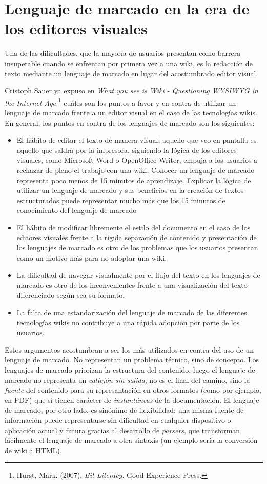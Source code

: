 \documentclass[12pt, a4paper,twoside]{book}
\begin{document}
\section{Lenguaje de marcado en la era de los editores visuales}

Una de las dificultades, que la mayoría de usuarios presentan como
barrera insuperable cuando se enfrentan por primera vez a una wiki,
es la redacción de texto mediante un lenguaje de marcado en lugar
del acostumbrado editor visual.

Cristoph Sauer ya expuso en
\emph{What you see is Wiki - Questioning WYSIWYG in the Internet Age}%
\footnote{Hurst, Mark. (2007). \emph{Bit Literacy}. Good Experience Press.}
cuáles son los puntos a favor y en contra de utilizar un lenguaje
de marcado frente a un editor visual en el caso de las tecnologías
wikis. En general, los puntos en contra de los lenguajes de marcado
son los siguientes:

\begin{itemize}
\item
  El hábito de editar el texto de manera visual, aquello que veo en
  pantalla es aquello que saldrá por la impresora, siguiendo la
  lógica de los editores visuales, como Microsoft Word o OpenOffice
  Writer, empuja a los usuarios a rechazar de pleno el trabajo con
  una wiki. Conocer un lenguaje de marcado representa poco menos de
  15 minutos de aprendizaje. Explicar la lógica de utilizar un
  lenguaje de marcado y sus beneficios en la creación de textos
  estructurados puede representar mucho más que los 15 minutos de
  conocimiento del lenguaje de marcado
\item
  El hábito de modificar libremente el estilo del documento en el
  caso de los editores visuales frente a la rígida separación de
  contenido y presentación de los lenguajes de marcado es otro de los
  problemas que los usuarios presentan como un motivo más para no
  adoptar una wiki.
\item
  La dificultad de navegar visualmente por el flujo del texto en los
  lenguajes de marcado es otro de los inconvenientes frente a una
  visualización del texto diferenciado según sea su formato.
\item
  La falta de una estandarización del lenguaje de marcado de las
  diferentes tecnologías wikis no contribuye a una rápida adopción
  por parte de los usuarios.
\end{itemize}
Estos argumentos acostumbran a ser los más utilizados en contra del
uso de un lenguaje de marcado. No representan un problema técnico,
sino de concepto. Los lenguajes de marcado priorizan la estructura
del contenido, luego el lenguaje de marcado no representa un
\emph{callejón sin salida}, no es el final del camino, sino la
\emph{fuente} del contenido para su represantación en otros
formatos (como por ejemplo, en PDF) que sí tienen carácter de
\emph{instantáneas} de la documentación. El lenguaje de marcado,
por otro lado, es sinónimo de flexibilidad: una misma fuente de
información puede representarse sin dificultad en cualquier
dispositivo o aplicación actual y futura gracias al desarrollo de
\emph{parsers}, que transforman fácilmente el lenguaje de marcado a
otra sintaxis (un ejemplo sería la conversión de wiki a HTML).
\end{document}
